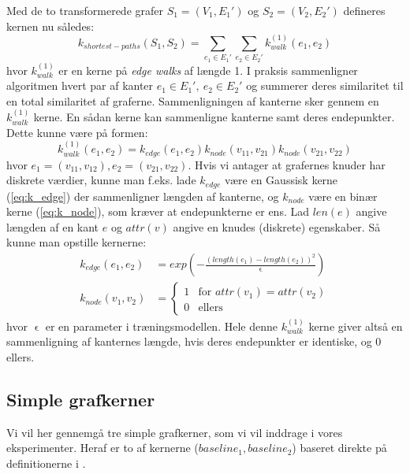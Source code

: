 \documentclass{article}
\def\eps{\mathrel{\epsilon}}
\begin{document}
Med de to transformerede grafer $S_1=(V_1,E_1')$ og $S_2=(V_2,E_2')$ defineres kernen nu således:
\begin{equation}
k_{shortest-paths}(S_1,S_2)=\sum_{e_1\in E_1'}\sum_{e_2\in E_2'}k^{(1)}_{walk}(e_1,e_2)
\end{equation}
hvor $k^{(1)}_{walk}$ er en kerne på \textit{edge walks} af længde 1. I praksis sammenligner algoritmen hvert par af kanter $e_1\in E_1',\ e_2\in E_2'$ og summerer deres similaritet til en total similaritet af graferne. Sammenligningen af kanterne sker gennem en $k^{(1)}_{walk}$ kerne. En sådan kerne kan sammenligne kanterne samt deres endepunkter. Dette kunne være på formen:
\begin{equation}
k^{(1)}_{walk}(e_1,e_2) = k_{edge}(e_1,e_2)k_{node}(v_{11},v_{21})k_{node}(v_{21},v_{22})
\end{equation}
hvor $e_1=(v_{11},v_{12}),e_2=(v_{21},v_{22})$. Hvis vi antager at grafernes knuder har diskrete værdier, kunne man f.eks. lade $k_{edge}$ være en Gaussisk kerne (\ref{eq:k_edge}) der sammenligner længden af kanterne, og $k_{node}$ være en binær kerne (\ref{eq:k_node}), som kræver at endepunkterne er ens. Lad $len(e)$ angive længden af en kant $e$ og $attr(v)$ angive en knudes (diskrete) egenskaber. Så kunne man opstille kernerne:
\begin{align}
\label{eq:k_edge}
k_{edge}(e_1,e_2)&=exp\left(-\frac{(length(e_1)-length(e_2))^2}{\eps}\right)\\
\label{eq:k_node}
k_{node}(v_1,v_2)&=
\begin{cases}
1 & \text{for }attr(v_1)=attr(v_2)\\
0 & \text{ellers}
\end{cases}
\end{align}
hvor $\eps$ er en parameter i træningsmodellen. Hele denne $k_{walk}^{(1)}$ kerne giver altså en sammenligning af kanternes længde, hvis deres endepunkter er identiske, og 0 ellers.

\subsection{Simple grafkerner}
Vi vil her gennemgå tre simple grafkerner, som vi vil inddrage i vores eksperimenter. Heraf er to af kernerne ($baseline_1,baseline_2$) baseret direkte på definitionerne i \cite{trivial-kernels}.
\end{document}
